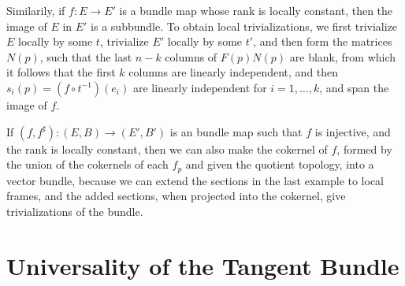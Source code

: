 \begin{example}
    Similarily, if $f: E \to E'$ is a bundle map whose rank is locally constant, then the image of $E$ in $E'$ is a subbundle. To obtain local trivializations, we first trivialize $E$ locally by some $t$, trivialize $E'$ locally by some $t'$, and then form the matrices $N(p)$, such that the last $n-k$ columns of $F(p)N(p)$ are blank, from which it follows that the first $k$ columns are linearly independent, and then $s_i(p) = (f \circ t^{-1})(e_i)$ are linearly independent for $i = 1, \dots, k$, and span the image of $f$.
\end{example}

\begin{example}
    If $(f,f^\sharp): (E,B) \to (E',B')$ is an bundle map such that $f$ is injective, and the rank is locally constant, then we can also make the cokernel of $f$, formed by the union of the cokernels of each $f_p$ and given the quotient topology, into a vector bundle, because we can extend the sections in the last example to local frames, and the added sections, when projected into the cokernel, give trivializations of the bundle.
\end{example}

\section{Universality of the Tangent Bundle}

